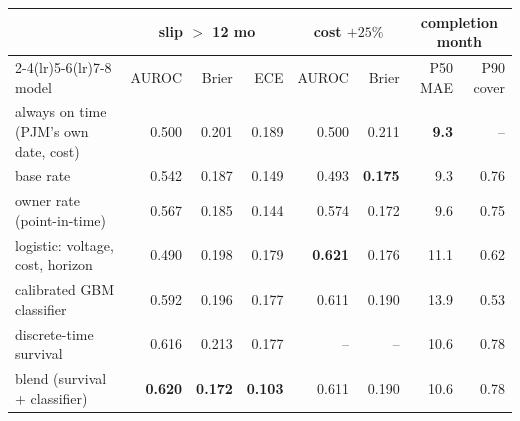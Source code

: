 \documentclass[11pt,a4paper]{article}
\begin{document}
\begin{center}
\footnotesize
\begin{tabular}{lrrrrrrr}
\toprule
& \multicolumn{3}{c}{slip $>$ 12 mo} & \multicolumn{2}{c}{cost $+25\%$} & \multicolumn{2}{c}{completion month} \\
\cmidrule(lr){2-4}\cmidrule(lr){5-6}\cmidrule(lr){7-8}
model & AUROC & Brier & ECE & AUROC & Brier & P50 MAE & P90 cover \\
\midrule
always on time (PJM's own date, cost) & 0.500 & 0.201 & 0.189 & 0.500 & 0.211 & \textbf{9.3} & -- \\
base rate & 0.542 & 0.187 & 0.149 & 0.493 & \textbf{0.175} & 9.3 & 0.76 \\
owner rate (point-in-time) & 0.567 & 0.185 & 0.144 & 0.574 & 0.172 & 9.6 & 0.75 \\
logistic: voltage, cost, horizon & 0.490 & 0.198 & 0.179 & \textbf{0.621} & 0.176 & 11.1 & 0.62 \\
calibrated GBM classifier & 0.592 & 0.196 & 0.177 & 0.611 & 0.190 & 13.9 & 0.53 \\
discrete-time survival & 0.616 & 0.213 & 0.177 & -- & -- & 10.6 & 0.78 \\
blend (survival + classifier) & \textbf{0.620} & \textbf{0.172} & \textbf{0.103} & 0.611 & 0.190 & 10.6 & 0.78 \\
\bottomrule
\end{tabular}
\end{center}
\end{document}
